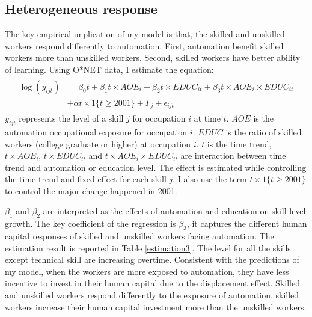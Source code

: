 \documentclass[12pt]{article}
\begin{document}
\subsection{Heterogeneous response}
The key empirical implication of my model is that, the skilled and unskilled workers respond differently to automation. First, automation benefit skilled workers more than unskilled workers. Second, skilled workers have better ability of learning. Using O*NET data, I estimate the equation: 
\begin{align}
\begin{split}
\log(y_{ijt}) &= \beta_0 t +\beta_1 t \times AOE_{i} + \beta_2 t \times EDUC_{it} +\beta_3 t \times AOE_{i} \times EDUC_{it} \\
&+ \alpha t \times 1\{t\ge 2001\} +\Gamma_j + \epsilon_{ijt}
\end{split}
\end{align}
$y_{ijt}$ represents the level of a skill $j$ for occupation $i$ at time $t$. $AOE$ is the automation occupational exposure for occupation $i$. $EDUC$ is the ratio of skilled workers (college graduate or higher) at occupation $i$. $t$ is the time trend, $t\times AOE_{i}$, $t\times EDUC_{it}$ and $t\times AOE_{i}\times EDUC_{it}$ are interaction between time trend and automation or education level. The effect is estimated while controlling the time trend and fixed effect for each skill $j$. I also use the term $t \times 1\{t\ge 2001\}$ to control the major change happened in 2001. 

$\beta_1$ and $\beta_2$ are interpreted as the effects of automation and education on skill level growth. The key coefficient of the regression is $\beta_3$, it captures the different human capital responses of skilled and unskilled workers facing automation. The estimation result is reported in Table \ref{estimation3}. The level for all the skills except technical skill are increasing overtime. Consistent with the predictions of my model, when the workers are more exposed to automation, they have less incentive to invest in their human capital due to the displacement effect. Skilled and unskilled workers respond differently to the exposure of automation, skilled workers increase their human capital investment more than the unskilled workers. 
\end{document}
